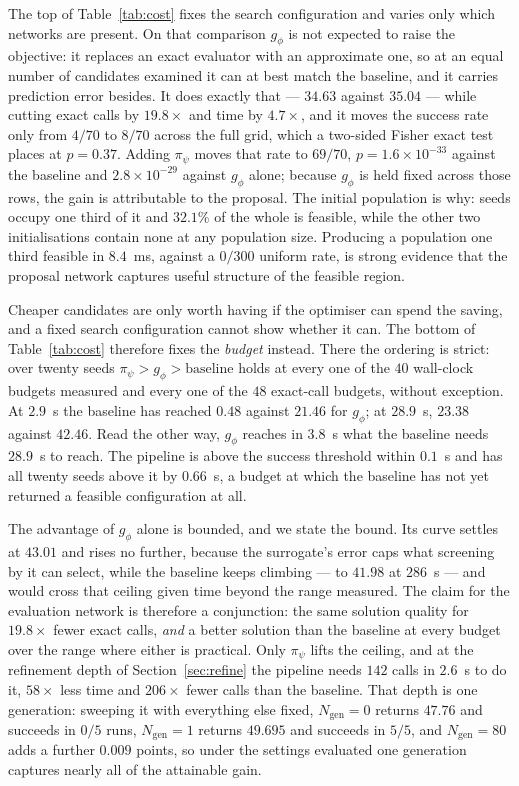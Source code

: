 \documentclass[journal,a4paper,comsoc,twocolumn]{IEEEtran}
\newcommand{\Ngen}{N_{\mathrm{gen}}}
\begin{document}
The top of Table~\ref{tab:cost} fixes the search configuration and varies only
which networks are present. On that comparison $g_\phi$ is not expected to raise
the objective: it replaces an exact evaluator with an approximate one, so at an
equal number of candidates examined it can at best match the baseline, and it
carries prediction error besides. It does exactly that --- $34.63$ against
$35.04$ --- while cutting exact calls by $19.8\times$ and time by $4.7\times$,
and it moves the success rate only from $4/70$ to $8/70$ across the full grid,
which a two-sided Fisher exact test places at $p = 0.37$. Adding $\pi_\psi$
moves that rate to $69/70$, $p = 1.6\times10^{-33}$ against the baseline and
$2.8\times10^{-29}$ against $g_\phi$ alone; because $g_\phi$ is held fixed
across those rows, the gain is attributable to the proposal. The initial
population is why: seeds occupy one third of it and $32.1\%$ of the whole is
feasible, while the other two initialisations contain none at any population
size. Producing a population one third feasible in $8.4$~ms, against a $0/300$
uniform rate, is strong evidence that the proposal network captures useful
structure of the feasible region.

Cheaper candidates are only worth having if the optimiser can spend the saving,
and a fixed search configuration cannot show whether it can. The bottom of
Table~\ref{tab:cost} therefore fixes the \emph{budget} instead. There the
ordering is strict: over twenty seeds $\pi_\psi > g_\phi > \text{baseline}$
holds at every one of the $40$ wall-clock budgets measured and every one of the
$48$ exact-call budgets, without exception. At $2.9$~s the baseline has reached
$0.48$ against $21.46$ for $g_\phi$; at $28.9$~s, $23.38$ against $42.46$. Read
the other way, $g_\phi$ reaches in $3.8$~s what the baseline needs $28.9$~s to
reach. The pipeline is above the success threshold within $0.1$~s and has all
twenty seeds above it by $0.66$~s, a budget at which the baseline has not yet
returned a feasible configuration at all.

The advantage of $g_\phi$ alone is bounded, and we state the bound. Its curve
settles at $43.01$ and rises no further, because the surrogate's error caps what
screening by it can select, while the baseline keeps climbing --- to $41.98$ at
$286$~s --- and would cross that ceiling given time beyond the range measured.
The claim for the evaluation network is therefore a conjunction: the same
solution quality for $19.8\times$ fewer exact calls, \emph{and} a better
solution than the baseline at every budget over the range where either is
practical. Only $\pi_\psi$ lifts the ceiling, and at the refinement depth of
Section~\ref{sec:refine} the pipeline needs $142$ calls in $2.6$~s to do it,
$58\times$ less time and $206\times$ fewer calls than the baseline. That depth
is one generation: sweeping it with everything else fixed, $\Ngen = 0$ returns
$47.76$ and succeeds in $0/5$ runs, $\Ngen = 1$ returns $49.695$ and succeeds in
$5/5$, and $\Ngen = 80$ adds a further $0.009$ points, so under the settings
evaluated one generation captures nearly all of the attainable gain.
\end{document}
